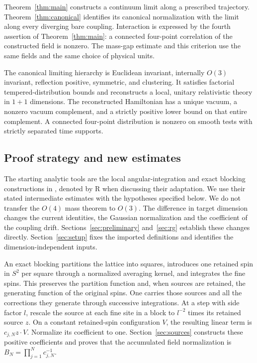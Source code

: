 Theorem~\ref{thm:main} constructs a continuum limit along a prescribed
trajectory.  Theorem~\ref{thm:canonical} identifies its canonical
normalization with the limit along every diverging bare coupling.
Interaction is expressed by the fourth assertion of
Theorem~\ref{thm:main}: a connected four-point correlation of the
constructed field is nonzero.  The mass-gap estimate and this criterion
use the same fields and the same choice of physical units.

\begin{corollary}\label{cor:canonical-physics}
The canonical limiting hierarchy is Euclidean invariant, internally
$O(3)$ invariant, reflection positive, symmetric, and clustering.  It
satisfies factorial tempered-distribution bounds and reconstructs a local,
unitary relativistic theory in $1+1$ dimensions.  The reconstructed
Hamiltonian has a unique vacuum, a nonzero vacuum complement, and a
strictly positive lower bound on that entire complement.  A connected
four-point distribution is nonzero on smooth tests with strictly separated
time supports.
\end{corollary}

\subsection{Proof strategy and new estimates}

The starting analytic tools are the local angular-integration and exact
blocking constructions in \cite{OpenAI-O4}, denoted by R when discussing
their adaptation. We use their stated intermediate estimates with the
hypotheses specified below. We do not transfer the $O(4)$ mass theorem to
$O(3)$. The difference in target dimension changes the current identities,
the Gaussian normalization and the coefficient of the coupling drift.
Sections~\ref{sec:preliminary} and~\ref{sec:rg} establish these changes
directly. Section~\ref{sec:setup} fixes the imported definitions and
identifies the dimension-independent inputs.

An exact blocking partitions the lattice into squares, introduces one
retained spin in $S^2$ per square through a normalized averaging kernel,
and integrates the fine spins. This preserves the partition function and,
when sources are retained, the generating function of the original spins.
One carries those sources and all the corrections they generate through
successive integrations. At a step with side factor $l$, rescale the
source at each fine site in a block to $l^{-2}$ times its retained source
$z$. On a constant retained-spin configuration $V$, the resulting
linear term is $c_{j,N}z\cdot V$. Normalize its coefficient to one.
Section~\ref{sec:sources} constructs these positive coefficients and
proves that the accumulated field normalization is
$B_N=\prod_{j=1}^N c_{j,N}^{-1}$.


